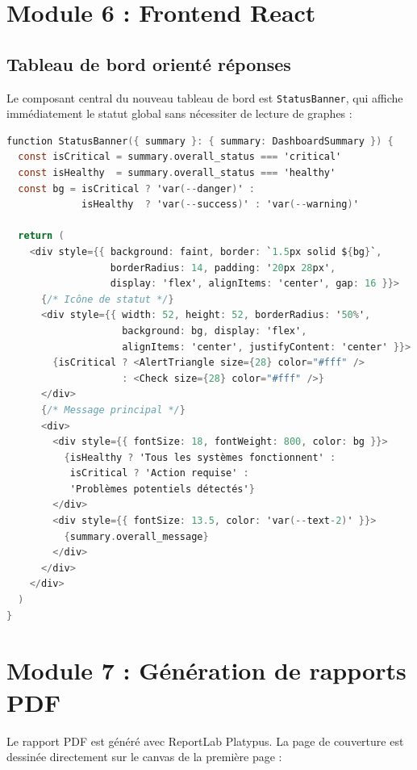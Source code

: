 \section{Module 6 : Frontend React}

\subsection{Tableau de bord orienté réponses}

Le composant central du nouveau tableau de bord est \texttt{StatusBanner},
qui affiche immédiatement le statut global sans nécessiter de lecture de graphes :

\begin{lstlisting}[language=C, caption={Extrait de \texttt{Dashboard.tsx} --- composant StatusBanner}]
function StatusBanner({ summary }: { summary: DashboardSummary }) {
  const isCritical = summary.overall_status === 'critical'
  const isHealthy  = summary.overall_status === 'healthy'
  const bg = isCritical ? 'var(--danger)' :
             isHealthy  ? 'var(--success)' : 'var(--warning)'

  return (
    <div style={{ background: faint, border: `1.5px solid ${bg}`,
                  borderRadius: 14, padding: '20px 28px',
                  display: 'flex', alignItems: 'center', gap: 16 }}>
      {/* Icône de statut */}
      <div style={{ width: 52, height: 52, borderRadius: '50%',
                    background: bg, display: 'flex',
                    alignItems: 'center', justifyContent: 'center' }}>
        {isCritical ? <AlertTriangle size={28} color="#fff" />
                    : <Check size={28} color="#fff" />}
      </div>
      {/* Message principal */}
      <div>
        <div style={{ fontSize: 18, fontWeight: 800, color: bg }}>
          {isHealthy ? 'Tous les systèmes fonctionnent' :
           isCritical ? 'Action requise' :
           'Problèmes potentiels détectés'}
        </div>
        <div style={{ fontSize: 13.5, color: 'var(--text-2)' }}>
          {summary.overall_message}
        </div>
      </div>
    </div>
  )
}
\end{lstlisting}

\section{Module 7 : Génération de rapports PDF}

Le rapport PDF est généré avec ReportLab Platypus. La page de couverture
est dessinée directement sur le canvas de la première page :

